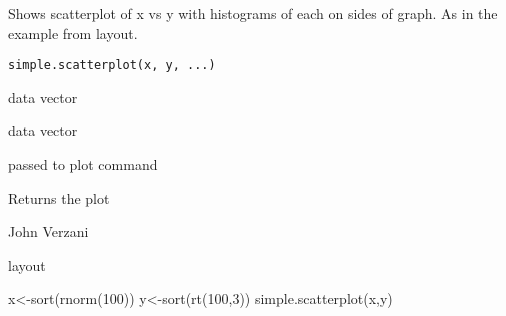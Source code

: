 \begin{Description}\relax
Shows scatterplot of x vs y with histograms of each on sides of
graph. As in the example from layout.
\end{Description}
\begin{Usage}
\begin{verbatim}
simple.scatterplot(x, y, ...)
\end{verbatim}
\end{Usage}
\begin{Arguments}
\begin{ldescription}
\item[\code{x}] data vector 
\item[\code{y}] data vector 
\item[\code{...}] passed to plot command 
\end{ldescription}
\end{Arguments}
\begin{Value}
Returns the plot
\end{Value}
\begin{Author}\relax
John Verzani
\end{Author}
\begin{SeeAlso}\relax
layout
\end{SeeAlso}
\begin{Examples}
\begin{ExampleCode}
  x<-sort(rnorm(100))
  y<-sort(rt(100,3))
  simple.scatterplot(x,y)

\end{ExampleCode}
\end{Examples}

